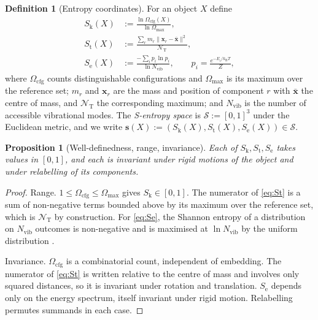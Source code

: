 \documentclass[11pt,twocolumn,a4paper]{article}
\theoremstyle{thmstyle}
\newtheorem{proposition}[theorem]{Proposition}
\theoremstyle{definition}
\newtheorem{definition}[theorem]{Definition}
\theoremstyle{remark}
\newcommand{\kB}{k_{\mathrm{B}}}
\newcommand{\Sk}{S_{\mathrm{k}}}
\newcommand{\St}{S_{\mathrm{t}}}
\newcommand{\Se}{S_{\mathrm{e}}}
\newcommand{\Sspace}{\mathcal{S}}
\newcommand{\Nvib}{N_{\mathrm{vib}}}
\newcommand{\norm}[1]{\lVert#1\rVert}
\begin{document}
\begin{definition}[Entropy coordinates]
\label{def:s-coords}
For an object $X$ define
\begin{align}
  \Sk(X) &:= \frac{\ln \Omega_{\mathrm{cfg}}(X)}{\ln \Omega_{\max}},
  \label{eq:Sk}\\[2pt]
  \St(X) &:= \frac{\sum_r m_r \norm{\mathbf{x}_r - \bar{\mathbf{x}}}^2}
                  {\mathcal{N}_{\mathrm{T}}},
  \label{eq:St}\\[2pt]
  \Se(X) &:= \frac{-\sum_i p_i \ln p_i}{\ln \Nvib},
  \qquad p_i = \frac{e^{-E_i/\kB T}}{Z},
  \label{eq:Se}
\end{align}
where $\Omega_{\mathrm{cfg}}$ counts distinguishable configurations and
$\Omega_{\max}$ is its maximum over the reference set; $m_r$ and
$\mathbf{x}_r$ are the mass and position of component $r$ with
$\bar{\mathbf{x}}$ the centre of mass, and $\mathcal{N}_{\mathrm{T}}$
the corresponding maximum; and $\Nvib$ is the number of accessible
vibrational modes. The \emph{S-entropy space} is
$\Sspace := [0,1]^3$ under the Euclidean metric, and we write
$\mathbf{s}(X) := (\Sk(X), \St(X), \Se(X)) \in \Sspace$.
\end{definition}

\begin{proposition}[Well-definedness, range, invariance]
\label{prop:s-range}
Each of $\Sk, \St, \Se$ takes values in $[0,1]$, and each is invariant
under rigid motions of the object and under relabelling of its
components.
\end{proposition}

\begin{proof}
Range. $1 \leq \Omega_{\mathrm{cfg}} \leq \Omega_{\max}$ gives
$\Sk \in [0,1]$. The numerator of \eqref{eq:St} is a sum of
non-negative terms bounded above by its maximum over the reference
set, which is $\mathcal{N}_{\mathrm{T}}$ by construction. For
\eqref{eq:Se}, the Shannon entropy of a distribution on $\Nvib$
outcomes is non-negative and is maximised at $\ln\Nvib$ by the uniform
distribution \citep{shannon1948,cover2006}.

Invariance. $\Omega_{\mathrm{cfg}}$ is a combinatorial count,
independent of embedding. The numerator of \eqref{eq:St} is written
relative to the centre of mass and involves only squared distances, so
it is invariant under rotation and translation. $\Se$ depends only on
the energy spectrum, itself invariant under rigid motion. Relabelling
permutes summands in each case.
\end{proof}
\end{document}
